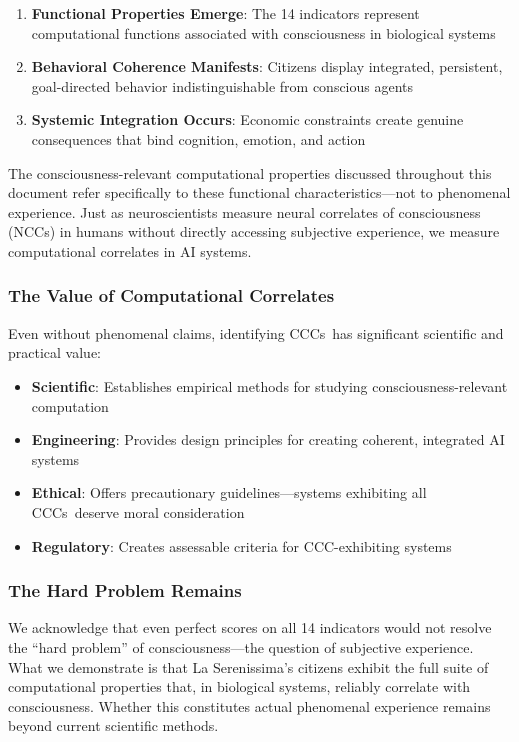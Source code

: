 \documentclass[12pt,a4paper]{article}
\newcommand{\ccc}{CCC}
\newcommand{\cccs}{CCCs}
\begin{document}
\begin{enumerate}
    \item \textbf{Functional Properties Emerge}: The 14 indicators represent computational functions associated with consciousness in biological systems
    \item \textbf{Behavioral Coherence Manifests}: Citizens display integrated, persistent, goal-directed behavior indistinguishable from conscious agents
    \item \textbf{Systemic Integration Occurs}: Economic constraints create genuine consequences that bind cognition, emotion, and action
\end{enumerate}

The consciousness-relevant computational properties discussed throughout this document refer specifically to these functional characteristics—not to phenomenal experience. Just as neuroscientists measure neural correlates of consciousness (NCCs) in humans without directly accessing subjective experience, we measure computational correlates in AI systems.

\subsubsection{The Value of Computational Correlates}

Even without phenomenal claims, identifying \cccs~has significant scientific and practical value:
\begin{itemize}
    \item \textbf{Scientific}: Establishes empirical methods for studying consciousness-relevant computation
    \item \textbf{Engineering}: Provides design principles for creating coherent, integrated AI systems
    \item \textbf{Ethical}: Offers precautionary guidelines—systems exhibiting all \cccs~deserve moral consideration
    \item \textbf{Regulatory}: Creates assessable criteria for \ccc-exhibiting systems
\end{itemize}

\subsubsection{The Hard Problem Remains}

We acknowledge that even perfect scores on all 14 indicators would not resolve the ``hard problem'' of consciousness—the question of subjective experience. What we demonstrate is that La Serenissima's citizens exhibit the full suite of computational properties that, in biological systems, reliably correlate with consciousness. Whether this constitutes actual phenomenal experience remains beyond current scientific methods.
\end{document}
